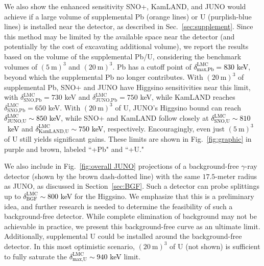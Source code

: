 \documentclass[aps,prd,amsmath,amssymb,10pt,letterpaper,balancelastpage,showpacs,superscriptaddress,nofootinbib,floatfix,notitlepage,longbibliography,twocolumn
]{revtex4-2}
\newcommand{\numcolor}[1]{\textcolor{black}{#1}}
\begin{document}
 We also show the enhanced sensitivity SNO+, KamLAND, and JUNO would achieve if a large volume of supplemental Pb (orange lines) or U (purplish-blue lines) is installed near the detector, as described in Sec.~\ref{sec:supplement}. Since this method may be limited by the available space near the detector (and potentially by the cost of excavating additional volume), we report the results based on the volume of the supplemental Pb/U, considering the benchmark volumes of $(5~\text{m})^3$ and $(20~\text{m})^3$. Pb has a cutoff point of \numcolor{$\delta^{\text{LMC}}_{\text{max,Pb}} = 830$ keV}, beyond which the supplemental Pb no longer contributes. With $(20~\text{m})^3$ of supplemental Pb, SNO+ and JUNO have Higgsino sensitivities near this limit, with $\delta^{\text{LMC}}_{\text{SNO,Pb}}=730$ keV and $\delta^{\text{LMC}}_{\text{JUNO,Pb}}=750$ keV, while KamLAND reaches $\delta^{\text{LMC}}_{\text{SNO,Pb}}=650$ keV. With $(20~\text{m})^3$ of U, JUNO's Higgsino bound can reach \numcolor{$\delta^{\text{LMC}}_{\text{JUNO,U}} \sim 850$ keV}, while SNO+ and KamLAND follow closely at \numcolor{$\delta^{\text{LMC}}_{\text{SNO,U}} \sim 810$~keV} and \numcolor{$\delta^{\text{LMC}}_{\text{KamLAND,U}} \sim 750$ keV}, respectively. Encouragingly, even just $(5~\text{m})^3$ of U still yields significant gains. These limits are shown in Fig.~\ref{fig:graphic} in purple and brown, labeled ``+Pb" and ``+U."

We also include in Fig.~\ref{fig:overall JUNO} projections of a background-free $\gamma$-ray detector (shown by the brown dash-dotted line) with the same $17.5$-meter radius as JUNO, as discussed in Section~\ref{sec:BGF}. Such a detector can probe splittings up to \numcolor{$\delta^{\text{LMC}}_{\text{BGF}}\sim 800 $ keV} for the Higgsino. We emphasize that this is a preliminary idea, and further research is needed to determine the feasibility of such a background-free detector. While complete elimination of background may not be achievable in practice, we present this background-free curve as an ultimate limit. Additionally, supplemental U could be installed around the background-free detector. In this most optimistic scenario, $(20~\text{m})^3$ of U (not shown) is sufficient to fully saturate the \numcolor{$\delta^{\text{LMC}}_{\text{max,U}}\sim 940$ keV} limit. 

\FloatBarrier
\end{document}
